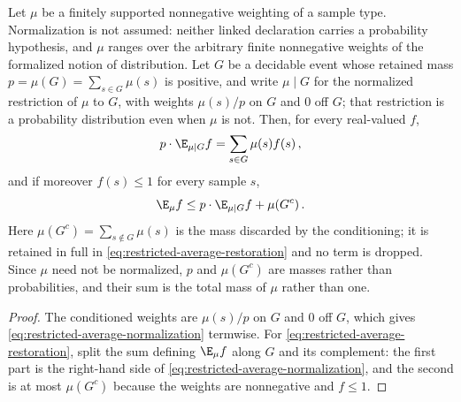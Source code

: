 \begin{lemma}
	\label{lem:restricted-average-mass-split}
	\leanok
	Let $\mu$ be a finitely supported nonnegative weighting of a sample type.
	Normalization is not assumed: neither linked declaration carries a
	probability hypothesis, and $\mu$ ranges over the arbitrary finite
	nonnegative weights of the formalized notion of distribution. Let $G$ be a
	decidable event whose retained mass
	$p = \mu(G) = \sum_{s \in G} \mu(s)$ is positive, and write
	$\mu \mid G$ for the normalized restriction of $\mu$ to $G$, with weights
	$\mu(s)/p$ on $G$ and $0$ off $G$; that restriction is a probability
	distribution even when $\mu$ is not. Then, for every real-valued $f$,
	\begin{equation}
		\label{eq:restricted-average-normalization}
		p \cdot \E_{\mu \mid G} f = \sum_{s \in G} \mu(s) f(s)\,,
	\end{equation}
	and if moreover $f(s) \le 1$ for every sample $s$,
	\begin{equation}
		\label{eq:restricted-average-restoration}
		\E_{\mu} f \le p \cdot \E_{\mu \mid G} f + \mu(G^{c})\,.
	\end{equation}
	Here $\mu(G^{c}) = \sum_{s \notin G} \mu(s)$ is the mass discarded by the
	conditioning; it is retained in full in
	\eqref{eq:restricted-average-restoration} and no term is dropped. Since
	$\mu$ need not be normalized, $p$ and $\mu(G^{c})$ are masses rather than
	probabilities, and their sum is the total mass of $\mu$ rather than one.
\end{lemma}
\begin{proof}
	\leanok
	The conditioned weights are $\mu(s)/p$ on $G$ and $0$ off $G$, which gives
	\eqref{eq:restricted-average-normalization} termwise. For
	\eqref{eq:restricted-average-restoration}, split the sum defining
	$\E_\mu f$ along $G$ and its complement: the first part is the right-hand
	side of \eqref{eq:restricted-average-normalization}, and the second is at
	most $\mu(G^{c})$ because the weights are nonnegative and $f \le 1$.
\end{proof}

